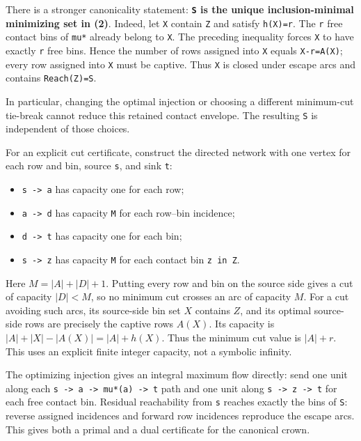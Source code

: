 There is a stronger canonicality statement: \textbf{\texttt{S} is the unique inclusion-minimal minimizing set in (2)}. Indeed, let \texttt{X} contain \texttt{Z} and satisfy \texttt{h(X)=r}. The \texttt{r} free contact bins of \texttt{mu*} already belong to \texttt{X}. The preceding inequality forces \texttt{X} to have exactly \texttt{r} free bins. Hence the number of rows assigned into \texttt{X} equals \texttt{\textbar{}X\textbar{}-r=\textbar{}A(X)\textbar{}}; every row assigned into \texttt{X} must be captive. Thus \texttt{X} is closed under escape arcs and contains \texttt{Reach(Z)=S}.

In particular, changing the optimal injection or choosing a different minimum-cut tie-break cannot reduce this retained contact envelope. The resulting \texttt{S} is independent of those choices.

For an explicit cut certificate, construct the directed network with one vertex for each row and bin, source \texttt{s}, and sink \texttt{t}:

\begin{itemize}
\tightlist
\item
  \texttt{s\ -\textgreater{}\ a} has capacity one for each row;
\item
  \texttt{a\ -\textgreater{}\ d} has capacity \texttt{M} for each row--bin incidence;
\item
  \texttt{d\ -\textgreater{}\ t} has capacity one for each bin;
\item
  \texttt{s\ -\textgreater{}\ z} has capacity \texttt{M} for each contact bin \texttt{z\ in\ Z}.
\end{itemize}

Here \(M=|A|+|D|+1\). Putting every row and bin on the source side gives a cut of capacity \(|D|<M\), so no minimum cut crosses an arc of capacity \(M\). For a cut avoiding such arcs, its source-side bin set \(X\) contains \(Z\), and its optimal source-side rows are precisely the captive rows \(A(X)\). Its capacity is \(|A|+|X|-|A(X)|=|A|+h(X)\). Thus the minimum cut value is \(|A|+r\). This uses an explicit finite integer capacity, not a symbolic infinity.

The optimizing injection gives an integral maximum flow directly: send one unit along each \texttt{s\ -\textgreater{}\ a\ -\textgreater{}\ mu*(a)\ -\textgreater{}\ t} path and one unit along \texttt{s\ -\textgreater{}\ z\ -\textgreater{}\ t} for each free contact bin. Residual reachability from \texttt{s} reaches exactly the bins of \texttt{S}: reverse assigned incidences and forward row incidences reproduce the escape arcs. This gives both a primal and a dual certificate for the canonical crown.

